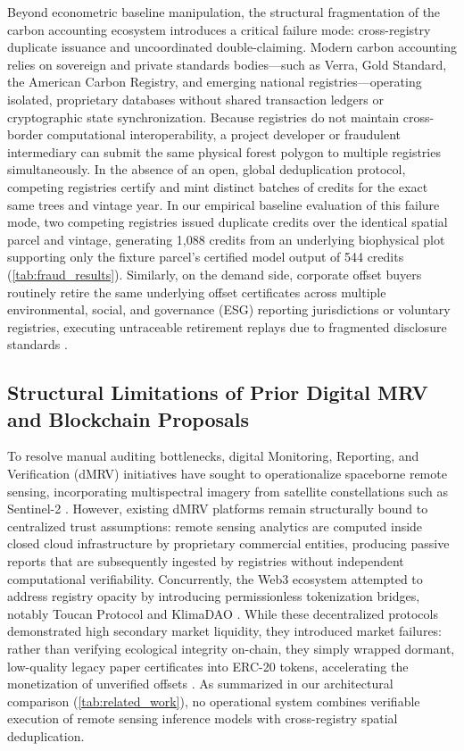 \documentclass[preprint,12pt]{elsarticle}
\begin{document}
Beyond econometric baseline manipulation, the structural fragmentation of the carbon accounting ecosystem introduces a critical failure mode: cross-registry duplicate issuance and uncoordinated double-claiming. Modern carbon accounting relies on sovereign and private standards bodies—such as Verra, Gold Standard, the American Carbon Registry, and emerging national registries—operating isolated, proprietary databases without shared transaction ledgers or cryptographic state synchronization. Because registries do not maintain cross-border computational interoperability, a project developer or fraudulent intermediary can submit the same physical forest polygon to multiple registries simultaneously. In the absence of an open, global deduplication protocol, competing registries certify and mint distinct batches of credits for the exact same trees and vintage year. In our empirical baseline evaluation of this failure mode, two competing registries issued duplicate credits over the identical spatial parcel and vintage, generating 1,088 credits from an underlying biophysical plot supporting only the fixture parcel's certified model output of 544 credits (\autoref{tab:fraud_results}). Similarly, on the demand side, corporate offset buyers routinely retire the same underlying offset certificates across multiple environmental, social, and governance (ESG) reporting jurisdictions or voluntary registries, executing untraceable retirement replays due to fragmented disclosure standards \cite{worldbank2022warehouse}.

\subsection{Structural Limitations of Prior Digital MRV and Blockchain Proposals}

To resolve manual auditing bottlenecks, digital Monitoring, Reporting, and Verification (dMRV) initiatives have sought to operationalize spaceborne remote sensing, incorporating multispectral imagery from satellite constellations such as Sentinel-2 \cite{drusch2012sentinel}. However, existing dMRV platforms remain structurally bound to centralized trust assumptions: remote sensing analytics are computed inside closed cloud infrastructure by proprietary commercial entities, producing passive reports that are subsequently ingested by registries without independent computational verifiability. Concurrently, the Web3 ecosystem attempted to address registry opacity by introducing permissionless tokenization bridges, notably Toucan Protocol \cite{toucan2022protocol} and KlimaDAO \cite{klimadao2022algorithmic}. While these decentralized protocols demonstrated high secondary market liquidity, they introduced market failures: rather than verifying ecological integrity on-chain, they simply wrapped dormant, low-quality legacy paper certificates into ERC-20 tokens, accelerating the monetization of unverified offsets \cite{franke2022operationalizing,mohan2023blockchain}. As summarized in our architectural comparison (\autoref{tab:related_work}), no operational system combines verifiable execution of remote sensing inference models with cross-registry spatial deduplication.
\end{document}
